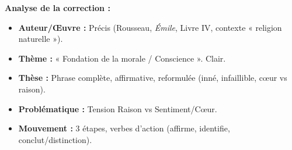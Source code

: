 \documentclass[11pt]{article}
\begin{document}
\begin{exoresolu}
\textbf{Analyse de la correction :}
\begin{itemize}
    \item \textbf{Auteur/Œuvre :} Précis (Rousseau, \emph{Émile}, Livre IV, contexte « religion naturelle »). 
    \item \textbf{Thème :} « Fondation de la morale / Conscience ». Clair.
    \item \textbf{Thèse :} Phrase complète, affirmative, reformulée (inné, infaillible, cœur vs raison). 
    \item \textbf{Problématique :} Tension Raison vs Sentiment/Cœur.
    \item \textbf{Mouvement :} 3 étapes, verbes d'action (affirme, identifie, conclut/distinction).
\end{itemize}
\end{exoresolu}
\end{document}
